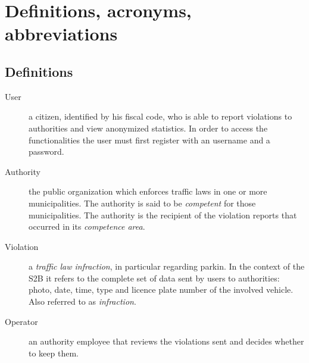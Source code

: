 \section{Definitions, acronyms, abbreviations}

\subsection*{Definitions}
\begin{description}
    \item[User] a citizen, identified by his fiscal code, who
    is able to report violations to authorities and view anonymized statistics.
    In order to access the functionalities the user must first register
    with an username and a password.
    \item[Authority] the public organization which enforces traffic
    laws in one or more municipalities.
    The authority is said to be \emph{competent} for those municipalities.
    The authority is the recipient of the violation reports that occurred
    in its \emph{competence area}.
    \item[Violation] a \emph{traffic law infraction}, in particular
    regarding parkin.
    In the context of the S2B it refers to the complete set of data sent by
    users to authorities: photo, date, time, type and licence plate number
    of the involved vehicle. Also referred to as \emph{infraction}.
    \item[Operator] an authority employee that reviews the violations
    sent and decides whether to keep them.
\end{description}


